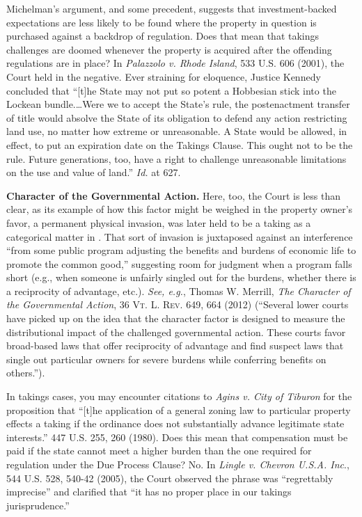 Michelman's argument, and some precedent, suggests that investment-backed
expectations are less likely to be found where the property in question is
purchased against a backdrop of regulation. Does that mean that takings
challenges are doomed whenever the property is acquired after the offending
regulations are in place? In \textit{Palazzolo v. Rhode Island}, 533 U.S. 606
(2001), the Court held in the negative. Ever straining for eloquence, Justice
Kennedy concluded that ``[t]he State may not put so potent a Hobbesian stick
into the Lockean bundle.\ldots Were we to accept the State's rule, the
postenactment transfer of title would absolve the State of its obligation to
defend any action restricting land use, no matter how extreme or unreasonable. A
State would be allowed, in effect, to put an expiration date on the Takings
Clause. This ought not to be the rule. Future generations, too, have a right to
challenge unreasonable limitations on the use and value of land.'' \textit{Id.}
at 627.

\item \textbf{Character of the Governmental Action.} Here, too, the Court is
less than clear, as its example of how this factor might be weighed in the
property owner's favor, a permanent physical invasion, was later held to be a
taking as a categorical matter in
. That sort of invasion is
juxtaposed against an interference ``from some public program adjusting the
benefits and burdens of economic life to promote the common good,'' suggesting
room for judgment when a program falls short (e.g., when someone is unfairly
singled out for the burdens, whether there is a reciprocity of advantage, etc.).
\textit{See, e.g.}, Thomas W. Merrill, \textit{The Character of the Governmental
Action}, 36 \textsc{Vt. L. Rev}. 649, 664 (2012) (``Several lower courts have
picked up on the idea that the character factor is designed to measure the
distributional impact of the challenged governmental action. These courts favor
broad-based laws that offer reciprocity of advantage and find suspect laws that
single out particular owners for severe burdens while conferring benefits on
others.'').

\item
In takings cases, you may encounter citations to \textit{Agins v. City of
Tiburon} for the proposition that ``[t]he application of a general zoning law to
particular property effects a taking if the ordinance does not substantially
advance legitimate state interests.'' 447 U.S. 255, 260 (1980). Does this mean
that compensation must be paid if the state cannot meet a higher burden than the
one required for regulation under the Due Process Clause? No. In \textit{Lingle
v. Chevron U.S.A. Inc}., 544 U.S. 528, 540-42 (2005), the Court observed the
phrase was ``regrettably imprecise'' and clarified that ``it has no proper place
in our takings jurisprudence.''



